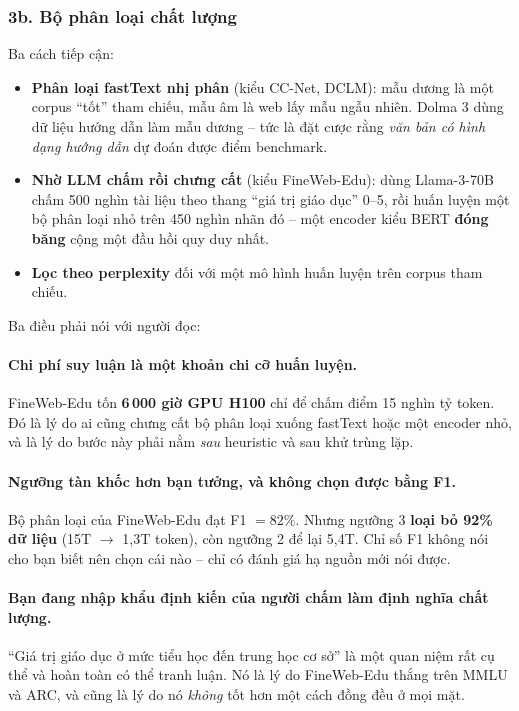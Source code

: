 \subsubsection{3b. Bộ phân loại chất lượng}

Ba cách tiếp cận:
\begin{itemize}
	\item \textbf{Phân loại fastText nhị phân} (kiểu CC-Net, DCLM): mẫu dương là một corpus “tốt” tham chiếu, mẫu âm là web lấy mẫu ngẫu nhiên. Dolma 3 dùng dữ liệu hướng dẫn làm mẫu dương -- tức là đặt cược rằng \emph{văn bản có hình dạng hướng dẫn} dự đoán được điểm benchmark.
	\item \textbf{Nhờ LLM chấm rồi chưng cất} (kiểu FineWeb-Edu): dùng Llama-3-70B chấm 500 nghìn tài liệu theo thang “giá trị giáo dục” 0--5, rồi huấn luyện một bộ phân loại nhỏ trên 450 nghìn nhãn đó -- một encoder kiểu BERT \textbf{đóng băng} cộng một đầu hồi quy duy nhất.
	\item \textbf{Lọc theo perplexity} đối với một mô hình huấn luyện trên corpus tham chiếu.
\end{itemize}

Ba điều phải nói với người đọc:

\paragraph{Chi phí suy luận là một khoản chi cỡ huấn luyện.} FineWeb-Edu tốn \textbf{6\,000 giờ GPU H100} chỉ để chấm điểm 15 nghìn tỷ token. Đó là lý do ai cũng chưng cất bộ phân loại xuống fastText hoặc một encoder nhỏ, và là lý do bước này phải nằm \emph{sau} heuristic và sau khử trùng lặp.

\paragraph{Ngưỡng tàn khốc hơn bạn tưởng, và không chọn được bằng F1.} Bộ phân loại của FineWeb-Edu đạt F1 $=82\%$. Nhưng ngưỡng 3 \textbf{loại bỏ 92\% dữ liệu} (15T $\rightarrow$ 1{,}3T token), còn ngưỡng 2 để lại 5{,}4T. Chỉ số F1 không nói cho bạn biết nên chọn cái nào -- chỉ có đánh giá hạ nguồn mới nói được.

\paragraph{Bạn đang nhập khẩu định kiến của người chấm làm định nghĩa chất lượng.} “Giá trị giáo dục ở mức tiểu học đến trung học cơ sở” là một quan niệm rất cụ thể và hoàn toàn có thể tranh luận. Nó là lý do FineWeb-Edu thắng trên MMLU và ARC, và cũng là lý do nó \emph{không} tốt hơn một cách đồng đều ở mọi mặt.

